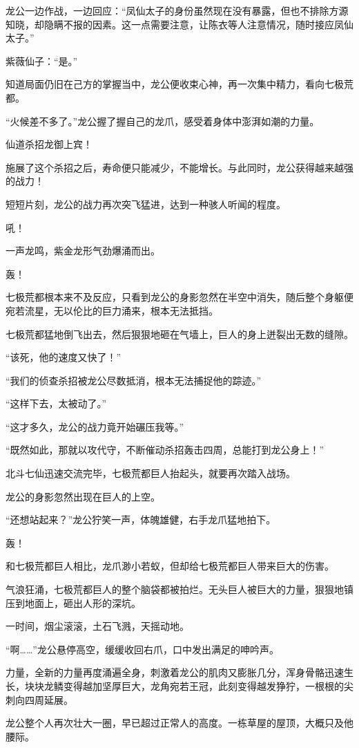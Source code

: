 \begin{this_body}
龙公一边作战，一边回应：“凤仙太子的身份虽然现在没有暴露，但也不排除方源知晓，却隐瞒不报的因素。这一点需要注意，让陈衣等人注意情况，随时接应凤仙太子。”

紫薇仙子：“是。”

知道局面仍旧在己方的掌握当中，龙公便收束心神，再一次集中精力，看向七极荒都。

“火候差不多了。”龙公握了握自己的龙爪，感受着身体中澎湃如潮的力量。

仙道杀招龙御上宾！

施展了这个杀招之后，寿命便只能减少，不能增长。与此同时，龙公获得越来越强的战力！

短短片刻，龙公的战力再次突飞猛进，达到一种骇人听闻的程度。

吼！

一声龙鸣，紫金龙形气劲爆涌而出。

轰！

七极荒都根本来不及反应，只看到龙公的身影忽然在半空中消失，随后整个身躯便宛若流星，无以伦比的巨力涌来，根本无法抵挡。

七极荒都猛地倒飞出去，然后狠狠地砸在气墙上，巨人的身上迸裂出无数的缝隙。

“该死，他的速度又快了！”

“我们的侦查杀招被龙公尽数抵消，根本无法捕捉他的踪迹。”

“这样下去，太被动了。”

“这才多久，龙公的战力竟开始碾压我等。”

“既然如此，那就以攻代守，不断催动杀招轰击四周，总能打到龙公身上！”

北斗七仙迅速交流完毕，七极荒都巨人抬起头，就要再次踏入战场。

龙公的身影忽然出现在巨人的上空。

“还想站起来？”龙公狞笑一声，体魄雄健，右手龙爪猛地拍下。

轰！

和七极荒都巨人相比，龙爪渺小若蚁，但却给七极荒都巨人带来巨大的伤害。

气浪狂涌，七极荒都巨人的整个脑袋都被拍烂。无头巨人被巨大的力量，狠狠地镇压到地面上，砸出人形的深坑。

一时间，烟尘滚滚，土石飞溅，天摇动地。

“啊……”龙公悬停高空，缓缓收回右爪，口中发出满足的呻吟声。

力量，全新的力量再度涌遍全身，刺激着龙公的肌肉又膨胀几分，浑身骨骼迅速生长，块块龙鳞变得越加坚厚巨大，龙角宛若王冠，此刻变得越发狰狞，一根根的尖刺向四周延展。

龙公整个人再次壮大一圈，早已超过正常人的高度。一栋草屋的屋顶，大概只及他腰际。


\end{this_body}
